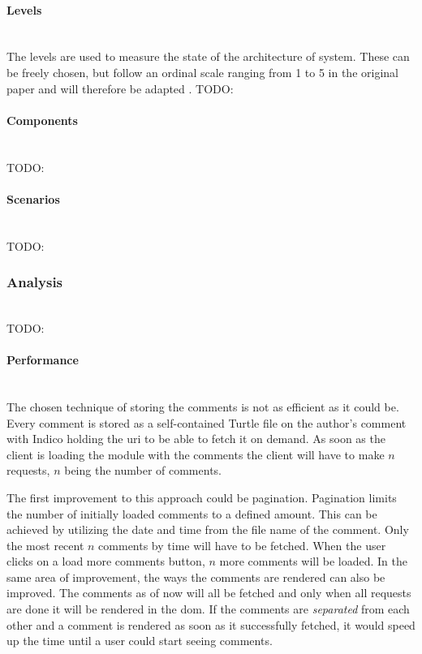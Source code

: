 \paragraph{Levels}\mbox{}\\

The levels are used to measure the state of the architecture of system. These can be freely chosen, but follow an ordinal scale ranging from 1 to 5 in the original paper and will therefore be adapted \cite{asqa-paper}.
TODO:
\vspace{0.5cm}
\paragraph{Components}\mbox{}\\

TODO:
\vspace{0.5cm}
\paragraph{Scenarios}\mbox{}\\

TODO:
\subsubsection{Analysis}\mbox{}\\

TODO:
\vspace{0.5cm}
\paragraph{Performance}\mbox{}\\

The chosen technique of storing the comments is not as efficient as it could be. Every comment is stored as a self-contained Turtle file on the author's comment with Indico holding the \gls{uri} to be able to fetch it on demand. As soon as the client is loading the module with the comments the client will have to make $n$ requests, $n$ being the number of comments.

The first improvement to this approach could be pagination. Pagination limits the number of initially loaded comments to a defined amount. This can be achieved by utilizing the date and time from the file name of the comment. Only the most recent $n$ comments by time will have to be fetched. When the user clicks on a load more comments button, $n$ more comments will be loaded.
In the same area of improvement, the ways the comments are rendered can also be improved. The comments as of now will all be fetched and only when all requests are done it will be rendered in the \gls{dom}. If the comments are \textit{separated} from each other and a comment is rendered as soon as it successfully fetched, it would speed up the time until a user could start seeing comments.

